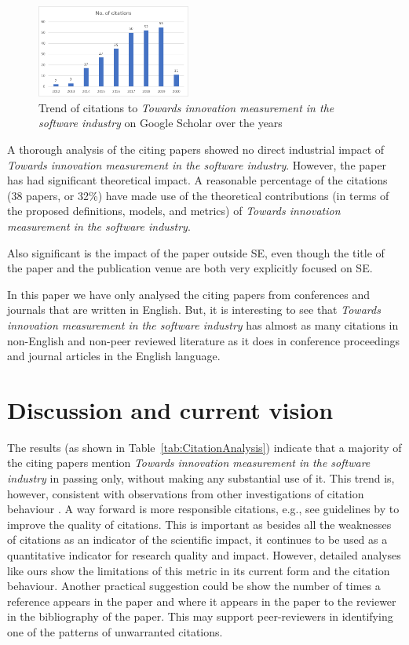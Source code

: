 \documentclass[sigconf,review]{acmart}
\newcommand{\theArticle}{\textit{Towards innovation measurement in the software industry}}
\begin{document}
\begin{figure}
	\begin{center}
		\includegraphics[width=0.45\textwidth,height=\textheight,keepaspectratio]{Figures/CitationsTrend.pdf}
	\end{center}
	\caption{Trend of citations to \theArticle{} on Google Scholar over the years}
	\label{fig:citationTrend}
\end{figure}

A thorough analysis of the citing papers showed no direct industrial impact of \theArticle. However, the paper has had significant theoretical impact. A reasonable percentage of the citations (38 papers, or 32\%) have made use of the theoretical contributions (in terms of the proposed definitions, models, and metrics) of \theArticle. 

Also significant is the impact of the paper outside SE, even though the title of the paper and the publication venue are both very explicitly focused on SE.

In this paper we have only analysed the citing papers from conferences and journals that are written in English. But, it is interesting to see that \theArticle{} has almost as many citations in non-English and non-peer reviewed literature as it does in conference proceedings and journal articles in the English language. 

\section{Discussion and current vision}\label{sec:fw}
The results (as shown in Table~\ref{tab:CitationAnalysis}) indicate that a majority of the citing papers mention \theArticle{} in passing only, without making any substantial use of it. This trend is, however, consistent with observations from other investigations of citation behaviour \cite{poulding2015using,bornmann2008citation}. A way forward is more responsible citations, e.g., see guidelines by \citet{penders2018ten} to improve the quality of citations. This is important as besides all the weaknesses of citations as an indicator of the scientific impact, it continues to be used as a quantitative indicator for research quality and impact. However, detailed analyses like ours show the limitations of this metric in its current form and the citation behaviour. Another practical suggestion could be show the number of times a reference appears in the paper and where it appears in the paper to the reviewer in the bibliography of the paper. This may support peer-reviewers in identifying one of the patterns of unwarranted citations.
\end{document}
